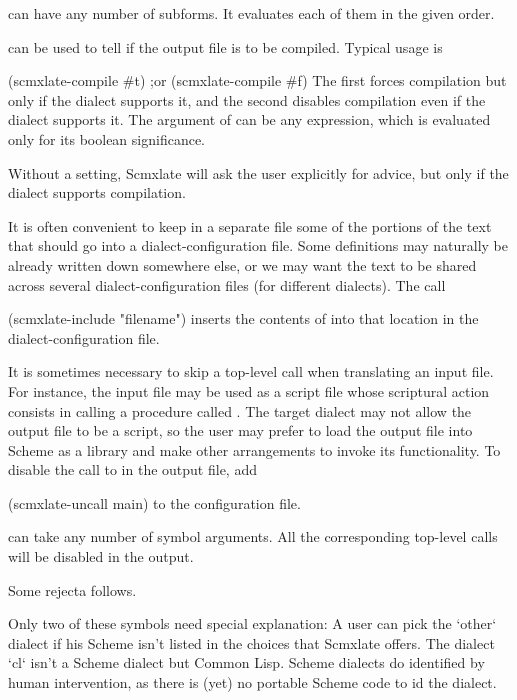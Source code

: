  can have any number of subforms.
It evaluates each of them in the given order.


 can be used to tell if the output
file is to be compiled.  Typical usage is

\begintts
(scmxlate-compile #t)      ;or
(scmxlate-compile #f)
\endtt
The first forces compilation but only if the dialect
supports it, and the second disables compilation even
if the dialect supports it.  The argument of
 can be any expression, which is
evaluated only for its boolean significance.

Without a  setting, Scmxlate will
ask the user explicitly for advice, but only if
the dialect supports compilation.


It is often convenient to keep in a separate file some
of the portions of the text that should go into a
dialect-configuration file.  Some definitions may
naturally be already written down somewhere else, or
we may want the text to be shared across several
dialect-configuration files (for different dialects).
The call

\begintts
(scmxlate-include "filename")
\endtt
inserts the contents of 
into that location in the dialect-configuration file.


It is sometimes necessary to skip a top-level
call when translating an input file.  For instance,
the input file may be used as a script file whose
scriptural action consists in calling a procedure
called .  The target dialect may not allow
the output file to be a script, so the user may prefer
to load the output file into Scheme as a library
and make other arrangements to invoke its
functionality.  To disable the call to 
in the output file, add

\begintts
(scmxlate-uncall main)
\endtt
to the configuration file.

 can take any number of symbol
arguments.  All the corresponding top-level calls
will be disabled in the output.

\bye

Some rejecta follows.

Only two of these symbols need special explanation: A
user can pick the `other` dialect if his Scheme isn’t
listed in the choices that Scmxlate offers.  The
dialect `cl` isn’t a Scheme dialect but Common Lisp.
Scheme dialects do identified  by human
intervention, as there is (yet) no portable Scheme code
to id the dialect.


